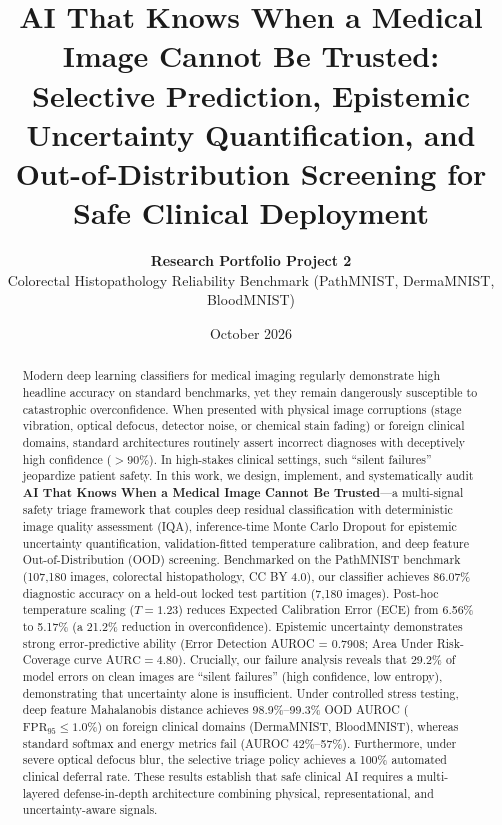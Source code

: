\documentclass[11pt,a4paper]{article}
\title{\textbf{\Large AI That Knows When a Medical Image Cannot Be Trusted:\\
Selective Prediction, Epistemic Uncertainty Quantification, and Out-of-Distribution Screening for Safe Clinical Deployment}}
\author{\textbf{Research Portfolio Project 2} \\
\normalsize Colorectal Histopathology Reliability Benchmark (PathMNIST, DermaMNIST, BloodMNIST)}
\date{\normalsize October 2026}
\begin{document}
\maketitle

\begin{abstract}
\noindent Modern deep learning classifiers for medical imaging regularly demonstrate high headline accuracy on standard benchmarks, yet they remain dangerously susceptible to catastrophic overconfidence. When presented with physical image corruptions (stage vibration, optical defocus, detector noise, or chemical stain fading) or foreign clinical domains, standard architectures routinely assert incorrect diagnoses with deceptively high confidence ($>90\%$). In high-stakes clinical settings, such ``silent failures'' jeopardize patient safety. In this work, we design, implement, and systematically audit \textbf{AI That Knows When a Medical Image Cannot Be Trusted}---a multi-signal safety triage framework that couples deep residual classification with deterministic image quality assessment (IQA), inference-time Monte Carlo Dropout for epistemic uncertainty quantification, validation-fitted temperature calibration, and deep feature Out-of-Distribution (OOD) screening. Benchmarked on the PathMNIST benchmark (107,180 images, colorectal histopathology, CC BY 4.0), our classifier achieves 86.07\% diagnostic accuracy on a held-out locked test partition (7,180 images). Post-hoc temperature scaling ($T=1.23$) reduces Expected Calibration Error (ECE) from 6.56\% to 5.17\% (a 21.2\% reduction in overconfidence). Epistemic uncertainty demonstrates strong error-predictive ability (Error Detection AUROC = 0.7908; Area Under Risk-Coverage curve $\text{AURC} = 4.80$). Crucially, our failure analysis reveals that 29.2\% of model errors on clean images are ``silent failures'' (high confidence, low entropy), demonstrating that uncertainty alone is insufficient. Under controlled stress testing, deep feature Mahalanobis distance achieves 98.9\%--99.3\% OOD AUROC ($\text{FPR}_{95} \le 1.0\%$) on foreign clinical domains (DermaMNIST, BloodMNIST), whereas standard softmax and energy metrics fail (AUROC 42\%--57\%). Furthermore, under severe optical defocus blur, the selective triage policy achieves a 100\% automated clinical deferral rate. These results establish that safe clinical AI requires a multi-layered defense-in-depth architecture combining physical, representational, and uncertainty-aware signals.
\end{abstract}

\vspace{0.5em}
\end{document}
